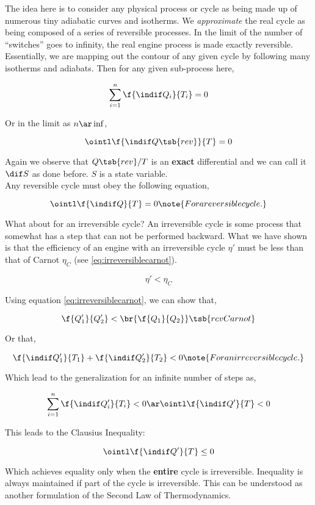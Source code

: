 \documentclass{article}
\begin{document}
The idea here is to consider any physical process or cycle as being made up of numerous tiny adiabatic curves and isotherms. We \textit{approximate} the real cycle as being composed of a series of reversible processes. In the limit of the number of ``switches'' goes to infinity, the real engine process is made exactly reversible. \\

Essentially, we are mapping out the contour of any given cycle by following many isotherms and adiabats. Then for any given sub-process here,

\[ \sum_{i=1}^{n} \f{\indif Q_i}{T_i} = 0 \]

Or in the limit as $n \ar \inf$,

\[ \ointl \f{\indif Q\tsb{rev}}{T} = 0 \]

Again we observe that $Q\tsb{rev}/T$ is an \textbf{exact} differential and we can call it $\dif S$ as done before. $S$ is a state variable. \\

Any reversible cycle must obey the following equation,

\[ \ointl \f{\indif Q}{T} = 0 \note{For a reversible cycle.} \]

What about for an irreversible cycle? An irreversible cycle is some process that somewhat has a step that can not be performed backward. What we have shown is that the efficiency of an engine with an irreversible cycle $\eta'$ must be less than that of Carnot $\eta_C$ (see \eqref{eq:irreversiblecarnot}).

\[ \eta' < \eta_C\]

Using equation \eqref{eq:irreversiblecarnot}, we can show that,

\[ \f{Q'_1}{Q'_2} < \br{\f{Q_1}{Q_2}}\tsb{rev Carnot} \]

Or that,

\[ \f{\indif Q'_1}{T_1} + \f{\indif Q'_2}{T_2} < 0 \note{For an irreversible cycle.} \]

Which lead to the generalization for an infinite number of steps as,

\[ \sum_{i=1}^{n} \f{\indif Q'_i}{T_i} < 0 \ar \ointl \f{\indif Q'}{T} < 0  \]

This leads to the Clausius Inequality:

\[ \ointl \f{\indif Q'}{T} \leq 0 \]

Which achieves equality only when the \textbf{entire} cycle is irreversible. Inequality is always maintained if  part of the cycle is irreversible. This can be understood as another formulation of the Second Law of Thermodynamics. \\
\end{document}
